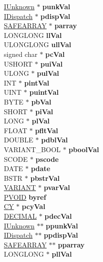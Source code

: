 \begin{DoxyCompactItemize}
\begin{tabbing}
\>\>\>\hyperlink{interface_i_unknown}{IUnknown} $\ast$ {\bfseries punkVal}\\
\>\>\>\hyperlink{interface_i_dispatch}{IDispatch} $\ast$ {\bfseries pdispVal}\\
\>\>\>\hyperlink{struct_i_ole_automation_types_1_1tag_s_a_f_e_a_r_r_a_y}{SAFEARRAY} $\ast$ {\bfseries parray}\\
\>\>\>LONGLONG {\bfseries llVal}\\
\>\>\>ULONGLONG {\bfseries ullVal}\\
\>\>\>signed char $\ast$ {\bfseries pcVal}\\
\>\>\>USHORT $\ast$ {\bfseries puiVal}\\
\>\>\>ULONG $\ast$ {\bfseries pulVal}\\
\>\>\>INT $\ast$ {\bfseries pintVal}\\
\>\>\>UINT $\ast$ {\bfseries puintVal}\\
\>\>\>BYTE $\ast$ {\bfseries pbVal}\\
\>\>\>SHORT $\ast$ {\bfseries piVal}\\
\>\>\>LONG $\ast$ {\bfseries plVal}\\
\>\>\>FLOAT $\ast$ {\bfseries pfltVal}\\
\>\>\>DOUBLE $\ast$ {\bfseries pdblVal}\\
\>\>\>VARIANT\_BOOL $\ast$ {\bfseries pboolVal}\\
\>\>\>SCODE $\ast$ {\bfseries pscode}\\
\>\>\>DATE $\ast$ {\bfseries pdate}\\
\>\>\>BSTR $\ast$ {\bfseries pbstrVal}\\
\>\>\>\hyperlink{structtag_v_a_r_i_a_n_t}{VARIANT} $\ast$ {\bfseries pvarVal}\\
\>\>\>\hyperlink{interfacevoid}{PVOID} {\bfseries byref}\\
\>\>\>\hyperlink{uniontag_c_y}{CY} $\ast$ {\bfseries pcyVal}\\
\>\>\>\hyperlink{structtag_d_e_c}{DECIMAL} $\ast$ {\bfseries pdecVal}\\
\>\>\>\hyperlink{interface_i_unknown}{IUnknown} $\ast$$\ast$ {\bfseries ppunkVal}\\
\>\>\>\hyperlink{interface_i_dispatch}{IDispatch} $\ast$$\ast$ {\bfseries ppdispVal}\\
\>\>\>\hyperlink{struct_i_ole_automation_types_1_1tag_s_a_f_e_a_r_r_a_y}{SAFEARRAY} $\ast$$\ast$ {\bfseries pparray}\\
\>\>\>LONGLONG $\ast$ {\bfseries pllVal}\\
$$
\end{tabbing}
\end{DoxyCompactItemize}
